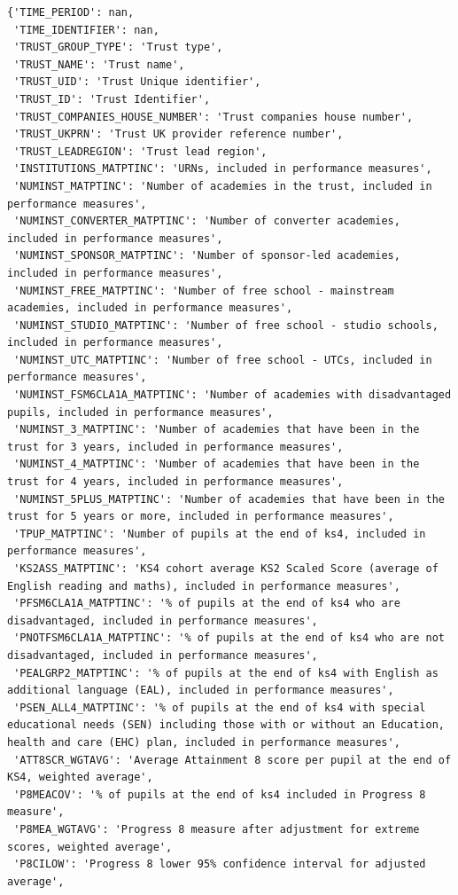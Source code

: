 \documentclass[
  letterpaper,
  DIV=11,
  numbers=noendperiod]{scrartcl}
\begin{document}
\begin{verbatim}
{'TIME_PERIOD': nan,
 'TIME_IDENTIFIER': nan,
 'TRUST_GROUP_TYPE': 'Trust type',
 'TRUST_NAME': 'Trust name',
 'TRUST_UID': 'Trust Unique identifier',
 'TRUST_ID': 'Trust Identifier',
 'TRUST_COMPANIES_HOUSE_NUMBER': 'Trust companies house number',
 'TRUST_UKPRN': 'Trust UK provider reference number',
 'TRUST_LEADREGION': 'Trust lead region',
 'INSTITUTIONS_MATPTINC': 'URNs, included in performance measures',
 'NUMINST_MATPTINC': 'Number of academies in the trust, included in performance measures',
 'NUMINST_CONVERTER_MATPTINC': 'Number of converter academies, included in performance measures',
 'NUMINST_SPONSOR_MATPTINC': 'Number of sponsor-led academies, included in performance measures',
 'NUMINST_FREE_MATPTINC': 'Number of free school - mainstream academies, included in performance measures',
 'NUMINST_STUDIO_MATPTINC': 'Number of free school - studio schools, included in performance measures',
 'NUMINST_UTC_MATPTINC': 'Number of free school - UTCs, included in performance measures',
 'NUMINST_FSM6CLA1A_MATPTINC': 'Number of academies with disadvantaged pupils, included in performance measures',
 'NUMINST_3_MATPTINC': 'Number of academies that have been in the trust for 3 years, included in performance measures',
 'NUMINST_4_MATPTINC': 'Number of academies that have been in the trust for 4 years, included in performance measures',
 'NUMINST_5PLUS_MATPTINC': 'Number of academies that have been in the trust for 5 years or more, included in performance measures',
 'TPUP_MATPTINC': 'Number of pupils at the end of ks4, included in performance measures',
 'KS2ASS_MATPTINC': 'KS4 cohort average KS2 Scaled Score (average of English reading and maths), included in performance measures',
 'PFSM6CLA1A_MATPTINC': '% of pupils at the end of ks4 who are disadvantaged, included in performance measures',
 'PNOTFSM6CLA1A_MATPTINC': '% of pupils at the end of ks4 who are not disadvantaged, included in performance measures',
 'PEALGRP2_MATPTINC': '% of pupils at the end of ks4 with English as additional language (EAL), included in performance measures',
 'PSEN_ALL4_MATPTINC': '% of pupils at the end of ks4 with special educational needs (SEN) including those with or without an Education, health and care (EHC) plan, included in performance measures',
 'ATT8SCR_WGTAVG': 'Average Attainment 8 score per pupil at the end of KS4, weighted average',
 'P8MEACOV': '% of pupils at the end of ks4 included in Progress 8 measure',
 'P8MEA_WGTAVG': 'Progress 8 measure after adjustment for extreme scores, weighted average',
 'P8CILOW': 'Progress 8 lower 95% confidence interval for adjusted average',

\end{verbatim}
\end{document}
